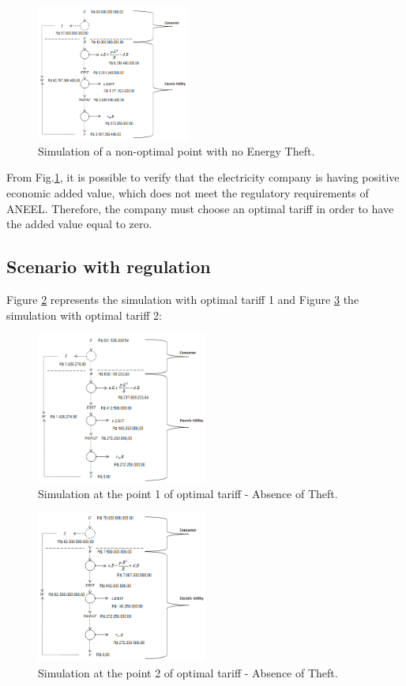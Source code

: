 \documentclass[10pt, letterpaper]{elsarticle}
\begin{document}
\begin{figure}[h]%
\centering
\includegraphics[width = 0.45\textwidth]{Fig6.png} 
\caption{Simulation of a non-optimal point with no Energy Theft.}
\label{Fig6}
\end{figure}

From Fig.\ref{Fig6}, it is possible to verify that the electricity company is having positive economic added value, which does not meet the regulatory requirements of ANEEL. Therefore, the company must choose an optimal tariff in order to have the added value equal to zero.\\

\subsection{Scenario with regulation}
\label{sec3-2}
Figure \ref{Fig7} represents the simulation with optimal tariff 1 and Figure \ref{Fig8} the simulation with optimal tariff 2:
\begin{figure}[h]%
\centering
\includegraphics[width = 0.5\textwidth]{Fig7.png} 
\caption{Simulation at the point 1 of optimal tariff - Absence of Theft.}
\label{Fig7}
\end{figure}


\begin{figure}[h]%
\centering
\includegraphics[width = 0.5\textwidth]{Fig8.png} 
\caption{Simulation at the point 2 of optimal tariff - Absence of Theft.}
\label{Fig8}
\end{figure}
\end{document}
